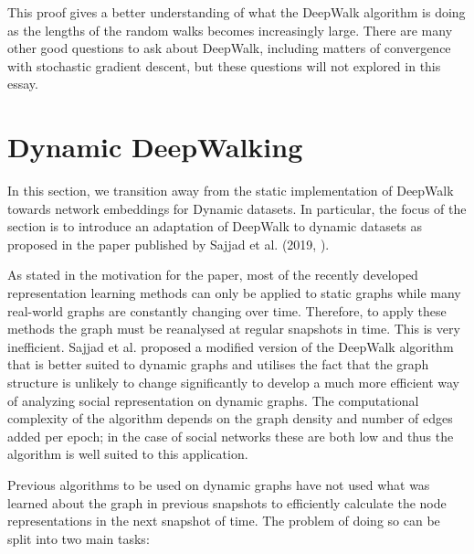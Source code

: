 \documentclass[a4paper]{article}
\begin{document}
\noindent This proof gives a better understanding of what the DeepWalk algorithm is doing as the lengths of the random walks becomes increasingly large.
There are many other good questions to ask about DeepWalk, including matters of convergence with stochastic gradient descent, but
these questions will not explored in this essay.
\section{Dynamic DeepWalking}
In this section, we transition away from the static implementation of DeepWalk
towards network embeddings for Dynamic datasets. In particular, the focus of the
section is to introduce an adaptation of DeepWalk to dynamic datasets as
proposed in the paper published by Sajjad et al. (2019, \cite{sajjad2019}).

As stated in the motivation for the paper, most of the recently developed
representation learning methods can only be applied to static graphs while many
real-world graphs are constantly changing over time. Therefore, to apply these
methods the graph must be reanalysed at regular snapshots in time. This is very
inefficient. Sajjad et al. proposed a modified version of the DeepWalk
algorithm that is better suited to dynamic graphs and utilises the fact that the
graph structure is unlikely to change significantly to develop a much more
efficient way of analyzing social representation on dynamic graphs.
The computational complexity of the algorithm depends on the graph density and
number of edges added per epoch; in the case of social networks these
are both low and thus the algorithm is well suited to this application.

Previous algorithms to be used on dynamic graphs have not used what
was learned about the graph in previous snapshots to efficiently calculate the
node representations in the next snapshot of time. The problem of doing so can
be split into two main tasks:
\end{document}
